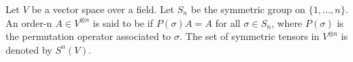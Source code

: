 \documentclass[12pt]{article}
\begin{document}
Let $V$ be a vector space over a field. Let $S_n$ be the symmetric group on
$\{1, \ldots, n\}$. An order-n  $A \in V^{\otimes n}$ is said to 
be \emph{} if $P(\sigma)A = A$ for all $\sigma \in S_n$,
where $P(\sigma)$ is the permutation operator associated to $\sigma$.
The set of symmetric tensors in $V^{\otimes n}$ is denoted by
$S^n(V)$.

\end{document}

